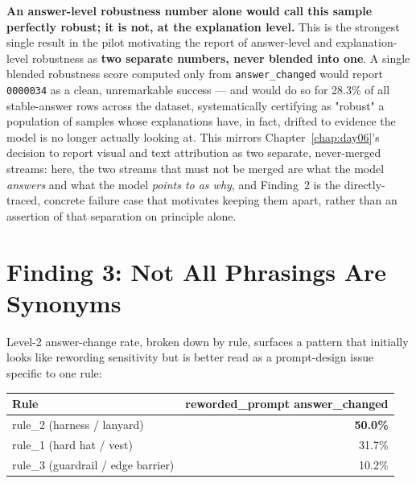 \textbf{An answer-level robustness number alone would call this sample perfectly robust; it is not,
at the explanation level.} This is the strongest single result in the pilot motivating the report of
answer-level and explanation-level robustness as \textbf{two separate numbers, never blended into
one}. A single blended robustness score computed only from \texttt{answer\_changed} would report
\texttt{0000034} as a clean, unremarkable success --- and would do so for 28.3\% of all stable-answer
rows across the dataset, systematically certifying as "robust" a population of samples whose
explanations have, in fact, drifted to evidence the model is no longer actually looking at. This
mirrors Chapter~\ref{chap:day06}'s decision to report visual and text attribution as two separate,
never-merged streams: here, the two streams that must not be merged are what the model
\emph{answers} and what the model \emph{points to as why}, and Finding~2 is the directly-traced,
concrete failure case that motivates keeping them apart, rather than an assertion of that separation
on principle alone.

\section{Finding 3: Not All Phrasings Are Synonyms}

Level-2 answer-change rate, broken down by rule, surfaces a pattern that initially looks like
rewording sensitivity but is better read as a prompt-design issue specific to one rule:

\begin{center}
\begin{tabular}{lr}
\toprule
\textbf{Rule} & \textbf{reworded\_prompt answer\_changed} \\
\midrule
rule\_2 (harness / lanyard) & \textbf{50.0\%} \\
rule\_1 (hard hat / vest) & 31.7\% \\
rule\_3 (guardrail / edge barrier) & 10.2\% \\
\bottomrule
\end{tabular}
\end{center}

